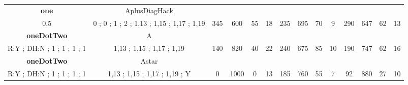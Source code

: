 \begin{table}[]
{\begin{tabular}{|c|c|c|c|c|c|c|c|c|c|c|c|c|c|}
\cellcolor{blue!15}\textbf{one} & AplusDiagHack& {\color[HTML]{00009B} } & {\color[HTML]{9A0000} } & {\color[HTML]{009901} } &  & {\color[HTML]{00009B} } & {\color[HTML]{9A0000} } & {\color[HTML]{009901} } &  & {\color[HTML]{00009B} } & {\color[HTML]{9A0000} } & {\color[HTML]{009901} } &  \\ 
\cellcolor{ blue!15}0,5 & 0 ; 0 ; 1 ; 2 ; 1,13 ; 1,15 ; 1,17 ; 1,19 & \multirow{-2}{*}{{\color[HTML]{00009B} 345}} & \multirow{-2}{*}{{\color[HTML]{9A0000} 600}} & \multirow{-2}{*}{{\color[HTML]{009901} 55}} & \multirow{-2}{*}{18} & \multirow{-2}{*}{{\color[HTML]{00009B} 235}} & \multirow{-2}{*}{{\color[HTML]{9A0000} 695}} & \multirow{-2}{*}{{\color[HTML]{009901} 70}} & \multirow{-2}{*}{9} & \multirow{-2}{*}{{\color[HTML]{00009B} 290}} & \multirow{-2}{*}{{\color[HTML]{9A0000} 647}} & \multirow{-2}{*}{{\color[HTML]{009901} 62}} & \multirow{-2}{*}{13} \\ \hline

\cellcolor{blue!15}\textbf{oneDotTwo} & A& {\color[HTML]{00009B} } & {\color[HTML]{9A0000} } & {\color[HTML]{009901} } &  & {\color[HTML]{00009B} } & {\color[HTML]{9A0000} } & {\color[HTML]{009901} } &  & {\color[HTML]{00009B} } & {\color[HTML]{9A0000} } & {\color[HTML]{009901} } &  \\ 
\cellcolor{ blue!15}R:Y ; DH:N ; 1 ; 1 ; 1 ; 1 & 1,13 ; 1,15 ; 1,17 ; 1,19 & \multirow{-2}{*}{{\color[HTML]{00009B} 140}} & \multirow{-2}{*}{{\color[HTML]{9A0000} 820}} & \multirow{-2}{*}{{\color[HTML]{009901} 40}} & \multirow{-2}{*}{22} & \multirow{-2}{*}{{\color[HTML]{00009B} 240}} & \multirow{-2}{*}{{\color[HTML]{9A0000} 675}} & \multirow{-2}{*}{{\color[HTML]{009901} 85}} & \multirow{-2}{*}{10} & \multirow{-2}{*}{{\color[HTML]{00009B} 190}} & \multirow{-2}{*}{{\color[HTML]{9A0000} 747}} & \multirow{-2}{*}{{\color[HTML]{009901} 62}} & \multirow{-2}{*}{16} \\ \hline

\cellcolor{blue!15}\textbf{oneDotTwo} & Astar& {\color[HTML]{00009B} } & {\color[HTML]{9A0000} } & {\color[HTML]{009901} } &  & {\color[HTML]{00009B} } & {\color[HTML]{9A0000} } & {\color[HTML]{009901} } &  & {\color[HTML]{00009B} } & {\color[HTML]{9A0000} } & {\color[HTML]{009901} } &  \\ 
\cellcolor{ blue!15}R:Y ; DH:N ; 1 ; 1 ; 1 ; 1 & 1,13 ; 1,15 ; 1,17 ; 1,19 ; Y & \multirow{-2}{*}{{\color[HTML]{00009B} 0}} & \multirow{-2}{*}{{\color[HTML]{9A0000} 1000}} & \multirow{-2}{*}{{\color[HTML]{009901} 0}} & \multirow{-2}{*}{13} & \multirow{-2}{*}{{\color[HTML]{00009B} 185}} & \multirow{-2}{*}{{\color[HTML]{9A0000} 760}} & \multirow{-2}{*}{{\color[HTML]{009901} 55}} & \multirow{-2}{*}{7} & \multirow{-2}{*}{{\color[HTML]{00009B} 92}} & \multirow{-2}{*}{{\color[HTML]{9A0000} 880}} & \multirow{-2}{*}{{\color[HTML]{009901} 27}} & \multirow{-2}{*}{10} \\ \hline


\end{tabular}}
\end{table}
